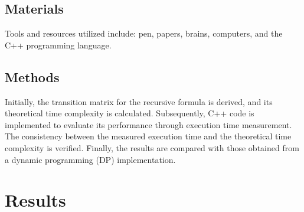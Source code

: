 \subsection{Materials}
Tools and resources utilized include: pen, papers, brains, computers, and the C++ programming language.
\subsection{Methods}
Initially, the transition matrix for the recursive formula is derived, and its theoretical time complexity is calculated. Subsequently, C++ code is implemented to evaluate its performance through execution time measurement. The consistency between the measured execution time and the theoretical time complexity is verified. Finally, the results are compared with those obtained from a dynamic programming (DP) implementation.

\section{Results}

